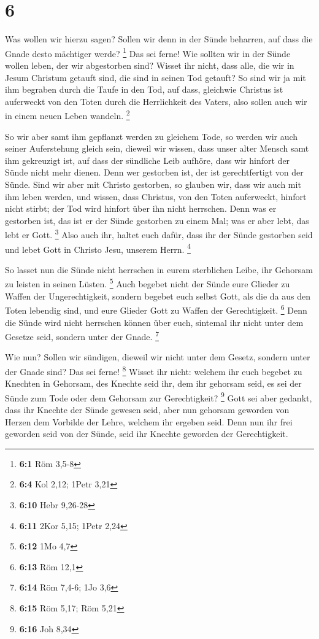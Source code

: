 \hypertarget{section-2}{%
\section{6}\label{section-2}}

 Was wollen wir hierzu sagen? Sollen wir denn in der Sünde
beharren, auf dass die Gnade desto mächtiger werde? \footnote{\textbf{6:1}
  Röm 3,5-8}  Das sei ferne! Wie sollten wir in der Sünde
wollen leben, der wir abgestorben sind?  Wisset ihr nicht,
dass alle, die wir in Jesum Christum getauft sind, die sind in seinen
Tod getauft?  So sind wir ja mit ihm begraben durch die
Taufe in den Tod, auf dass, gleichwie Christus ist auferweckt von den
Toten durch die Herrlichkeit des Vaters, also sollen auch wir in einem
neuen Leben wandeln. \footnote{\textbf{6:4} Kol 2,12; 1Petr 3,21}

 So wir aber samt ihm gepflanzt werden zu gleichem Tode, so
werden wir auch seiner Auferstehung gleich sein,  dieweil
wir wissen, dass unser alter Mensch samt ihm gekreuzigt ist, auf dass
der sündliche Leib aufhöre, dass wir hinfort der Sünde nicht mehr
dienen.  Denn wer gestorben ist, der ist gerechtfertigt von
der Sünde.  Sind wir aber mit Christo gestorben, so glauben
wir, dass wir auch mit ihm leben werden,  und wissen, dass
Christus, von den Toten auferweckt, hinfort nicht stirbt; der Tod wird
hinfort über ihn nicht herrschen.  Denn was er gestorben
ist, das ist er der Sünde gestorben zu einem Mal; was er aber lebt, das
lebt er Gott. \footnote{\textbf{6:10} Hebr 9,26-28}  Also
auch ihr, haltet euch dafür, dass ihr der Sünde gestorben seid und lebet
Gott in Christo Jesu, unserem Herrn. \footnote{\textbf{6:11} 2Kor 5,15;
  1Petr 2,24}

 So lasset nun die Sünde nicht herrschen in eurem
sterblichen Leibe, ihr Gehorsam zu leisten in seinen Lüsten. \footnote{\textbf{6:12}
  1Mo 4,7}  Auch begebet nicht der Sünde eure Glieder zu
Waffen der Ungerechtigkeit, sondern begebet euch selbst Gott, als die da
aus den Toten lebendig sind, und eure Glieder Gott zu Waffen der
Gerechtigkeit. \footnote{\textbf{6:13} Röm 12,1}  Denn die
Sünde wird nicht herrschen können über euch, sintemal ihr nicht unter
dem Gesetze seid, sondern unter der Gnade. \footnote{\textbf{6:14} Röm
  7,4-6; 1Jo 3,6}

 Wie nun? Sollen wir sündigen, dieweil wir nicht unter dem
Gesetz, sondern unter der Gnade sind? Das sei ferne! \footnote{\textbf{6:15}
  Röm 5,17; Röm 5,21}  Wisset ihr nicht: welchem ihr euch
begebet zu Knechten in Gehorsam, des Knechte seid ihr, dem ihr gehorsam
seid, es sei der Sünde zum Tode oder dem Gehorsam zur Gerechtigkeit?
\footnote{\textbf{6:16} Joh 8,34}  Gott sei aber gedankt,
dass ihr Knechte der Sünde gewesen seid, aber nun gehorsam geworden von
Herzen dem Vorbilde der Lehre, welchem ihr ergeben seid. 
Denn nun ihr frei geworden seid von der Sünde, seid ihr Knechte geworden
der Gerechtigkeit.

